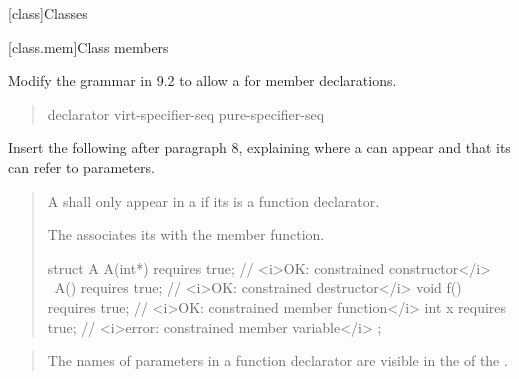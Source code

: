 
\setcounter{chapter}{8}
[class]{Classes}

\setcounter{section}{1}
[class.mem]{Class members}

Modify the grammar in 9.2 to allow a 
 for member declarations.

\begin{quote}
\pnum
\begin{bnf}
  declarator virt-specifier-seq\opt {} pure-specifier-seq\opt
\end{bnf}
\end{quote}

Insert the following after paragraph 8, explaining where a
 can appear
and that its 
can refer to parameters.

\begin{quote}
\setcounter{Paras}{8}
\pnum
A  shall only appear
in a  if its
 is a function declarator.

The  associates its 
 with the 
member function.

\enterexample
\begin{codeblock}
  struct A {
    A(int*) requires true;  // <i>OK: constrained constructor</i>
    ~A() requires true;     // <i>OK: constrained destructor</i>
    void f() requires true; // <i>OK: constrained member function</i>
    int x requires true;    // <i>error: constrained member variable</i>
  };
\end{codeblock}
\exitexample
\end{quote}

\begin{quote}
\pnum
The names of parameters in a function declarator are visible in the
 of the
. 
\end{quote}
